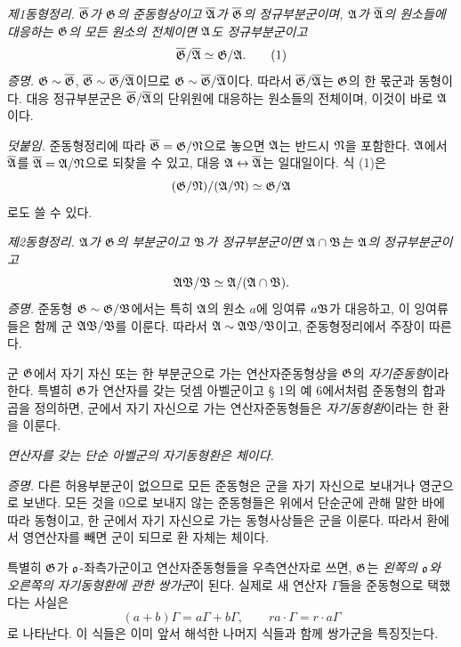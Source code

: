 \emph{제1동형정리.} \emph{\(\overline{\mathfrak G}\)가 \(\mathfrak G\)의 준동형상이고 \(\overline{\mathfrak A}\)가 \(\overline{\mathfrak G}\)의 정규부분군이며, \(\mathfrak A\)가 \(\overline{\mathfrak A}\)의 원소들에 대응하는 \(\mathfrak G\)의 모든 원소의 전체이면 \(\mathfrak A\)도 정규부분군이고}
\[
        \overline{\mathfrak G}/\overline{\mathfrak A}\simeq\mathfrak G/\mathfrak A. \tag{1}
\]
\emph{증명.} \(\mathfrak G\sim\overline{\mathfrak G}\), \(\overline{\mathfrak G}\sim\overline{\mathfrak G}/\overline{\mathfrak A}\)이므로 \(\mathfrak G\sim\overline{\mathfrak G}/\overline{\mathfrak A}\)이다. 따라서 \(\overline{\mathfrak G}/\overline{\mathfrak A}\)는 \(\mathfrak G\)의 한 몫군과 동형이다. 대응 정규부분군은 \(\overline{\mathfrak G}/\overline{\mathfrak A}\)의 단위원에 대응하는 원소들의 전체이며, 이것이 바로 \(\mathfrak A\)이다.

\emph{덧붙임.} 준동형정리에 따라 \(\overline{\mathfrak G}=\mathfrak G/\mathfrak N\)으로 놓으면 \(\mathfrak A\)는 반드시 \(\mathfrak N\)을 포함한다. \(\mathfrak A\)에서 \(\overline{\mathfrak A}\)를 \(\overline{\mathfrak A}=\mathfrak A/\mathfrak N\)으로 되찾을 수 있고, 대응 \(\mathfrak A\leftrightarrow\overline{\mathfrak A}\)는 일대일이다. 식 (1)은
\[
        (\mathfrak G/\mathfrak N)/(\mathfrak A/\mathfrak N)\simeq\mathfrak G/\mathfrak A
\]
로도 쓸 수 있다.

\emph{제2동형정리.} \emph{\(\mathfrak A\)가 \(\mathfrak G\)의 부분군이고 \(\mathfrak B\)가 정규부분군이면 \(\mathfrak A\cap\mathfrak B\)는 \(\mathfrak A\)의 정규부분군이고}
\[
        \mathfrak A\mathfrak B/\mathfrak B\simeq\mathfrak A/(\mathfrak A\cap\mathfrak B).
\]
\emph{증명.} 준동형 \(\mathfrak G\sim\mathfrak G/\mathfrak B\)에서는 특히 \(\mathfrak A\)의 원소 \(a\)에 잉여류 \(a\mathfrak B\)가 대응하고, 이 잉여류들은 함께 군 \(\mathfrak A\mathfrak B/\mathfrak B\)를 이룬다. 따라서 \(\mathfrak A\sim\mathfrak A\mathfrak B/\mathfrak B\)이고, 준동형정리에서 주장이 따른다.

군 \(\mathfrak G\)에서 자기 자신 또는 한 부분군으로 가는 연산자준동형상을 \(\mathfrak G\)의 \emph{자기준동형}이라 한다. 특별히 \(\mathfrak G\)가 연산자를 갖는 덧셈 아벨군이고 § 1의 예 6에서처럼 준동형의 합과 곱을 정의하면, 군에서 자기 자신으로 가는 연산자준동형들은 \emph{자기동형환}이라는 한 환을 이룬다.

\emph{연산자를 갖는 단순 아벨군의 자기동형환은 체이다.}

\emph{증명.} 다른 허용부분군이 없으므로 모든 준동형은 군을 자기 자신으로 보내거나 영군으로 보낸다. 모든 것을 0으로 보내지 않는 준동형들은 위에서 단순군에 관해 말한 바에 따라 동형이고, 한 군에서 자기 자신으로 가는 동형사상들은 군을 이룬다. 따라서 환에서 영연산자를 빼면 군이 되므로 환 자체는 체이다.

특별히 \(\mathfrak G\)가 \(\mathfrak o\)-좌측가군이고 연산자준동형들을 우측연산자로 쓰면, \(\mathfrak G\)는 \emph{왼쪽의 \(\mathfrak o\)와 오른쪽의 자기동형환에 관한 쌍가군}이 된다. 실제로 새 연산자 \(\Gamma\)들을 준동형으로 택했다는 사실은
\[
        (a+b)\Gamma=a\Gamma+b\Gamma,
        \qquad
        ra\cdot\Gamma=r\cdot a\Gamma
\]
로 나타난다. 이 식들은 이미 앞서 해석한 나머지 식들과 함께 쌍가군을 특징짓는다.

